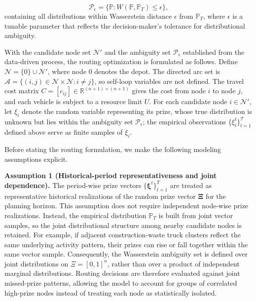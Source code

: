 \documentclass[preprint,12pt,authoryear]{elsarticle}
\theoremstyle{definition}
\begin{document}
\begin{equation}
\mathcal{P}_\epsilon = \{ \mathbb{P} : W(\mathbb{P}, \mathbb{P}_T) \le \epsilon \},
\end{equation}
\noindent containing all distributions within Wasserstein distance $\epsilon$ from $\mathbb{P}_T$, where $\epsilon$ is a tunable parameter that reflects the decision-maker's tolerance for distributional ambiguity.

With the candidate node set $\mathcal{N'}$ and the ambiguity set $\mathcal{P}_\epsilon$ established from the data-driven process, the routing optimization is formulated as follows. Define $\mathcal{N} = \{0\} \cup \mathcal{N'}$, where node $0$ denotes the depot. The directed arc set is $\mathcal{A}=\{(i,j)\in\mathcal{N}\times\mathcal{N}:i\neq j\}$, so self-loop variables are not defined. The travel cost matrix $C = [c_{ij}] \in \mathbb{R}^{(n+1)\times(n+1)}$ gives the cost from node $i$ to node $j$, and each vehicle is subject to a resource limit $U$. For each candidate node $i \in \mathcal{N'}$, let $\xi_i$ denote the random variable representing its prize, whose true distribution is unknown but lies within the ambiguity set $\mathcal{P}_\epsilon$; the empirical observations $\{\xi^t_i\}_{t=1}^\mathcal{T}$ defined above serve as finite samples of $\xi_i$.




Before stating the routing formulation, we make the following modeling assumptions explicit.

\textbf{Assumption 1 (Historical-period representativeness and joint dependence).}
The period-wise prize vectors $\{\boldsymbol{\xi}^t\}_{t=1}^{T}$ are treated as representative historical realizations of the random prize vector $\boldsymbol{\Xi}$ for the planning horizon. This assumption does not require independent node-wise prize realizations. Instead, the empirical distribution $\mathbb{P}_T$ is built from joint vector samples, so the joint distributional structure among nearby candidate nodes is retained. For example, if adjacent construction-waste truck clusters reflect the same underlying activity pattern, their prizes can rise or fall together within the same vector sample. Consequently, the Wasserstein ambiguity set is defined over joint distributions on $\Xi=[0,1]^n$, rather than over a product of independent marginal distributions. Routing decisions are therefore evaluated against joint missed-prize patterns, allowing the model to account for groups of correlated high-prize nodes instead of treating each node as statistically isolated.
\end{document}
